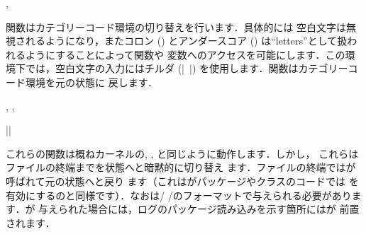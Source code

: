\documentclass[uplatex,dvipdfmx,full,kernel]{wtpl3doc}
\begin{document}
\begin{documentation}
\begin{function}[updated = 2011-08-13]{\ExplSyntaxOn, \ExplSyntaxOff}
  \begin{syntax}
      
  \end{syntax}
  関数はカテゴリーコード環境の切り替えを行います．具体的には
  空白文字は無視されるようになり，またコロン (\code{:}) とアンダースコア
  (\code{_}) は\enquote{letters}として扱われるようにすることによって関数や
  変数へのアクセスを可能にします．この環境下では，空白文字の入力にはチルダ
  (|~|) を使用します．関数はカテゴリーコード環境を元の状態に
  戻します．
\end{function}

\begin{function}[updated = 2017-03-19]
  {\ProvidesExplPackage, \ProvidesExplClass, \ProvidesExplFile}
  \begin{syntax}
    |\RequirePackage{expl3}| \\
        
  \end{syntax}
  これらの関数は概ね\LaTeXe カーネルの,
  , と同じように動作します．しかし，
  これらはファイルの終端までを状態へと暗黙的に切り替え
  ます．ファイルの終端ではが呼ばれて元の状態へと戻り
  ます（これは\LaTeXe がパッケージやクラスのコードでは%
  を有効にするのと同様です）．なおは/%
  /のフォーマットで与えられる必要があります．が
  与えられた場合には，ログのパッケージ読み込みを示す箇所にはが
  前置されます．
\end{function}


\end{documentation}
\end{document}
